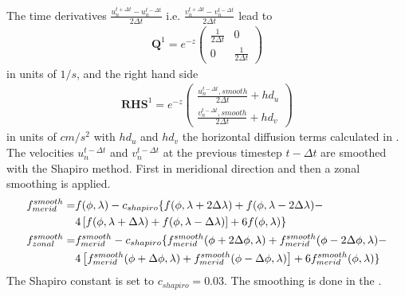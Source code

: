 %
The time derivatives $\frac{ u_n^{t+ \Delta t}- u_n^{t-\Delta t}}{2
\Delta t}$ i.e. $\frac{ v_n^{t+ \Delta t}- v_n^{t-\Delta t}}{2
\Delta t}$ lead to
%
\begin{gather}
  \mathbf{Q}^1= e^{-z}
   \begin{pmatrix}
       \frac{1}{2 \Delta t}&  0\\
       0                   & \frac{1}{2 \Delta t}
   \end{pmatrix}
\end{gather}
%
in units of $1/s$, and the right hand side
%
\begin{gather}
  \mathbf{RHS}^1=e^{-z}
   \begin{pmatrix}
       \frac{u_n^{t-\Delta t},smooth}{2 \Delta t} + hd_u\\
       \frac{v_n^{t-\Delta t},smooth}{2 \Delta t} + hd_v
   \end{pmatrix}
\end{gather}
%
in units of $cm/s^2$ with $hd_u$ and $hd_v$ the horizontal diffusion terms calculated in
 . The velocities $u_n^{t-\Delta t}$ and
$v_n^{t-\Delta t}$ at the previous timestep $t-\Delta t$ are
smoothed with the Shapiro method. First in meridional direction and
then a zonal smoothing is applied.
%
\begin{align}
  f^{smooth}_{merid} = & f(\phi,\lambda) - c_{shapiro}\{  f(\phi,\lambda+2\Delta \lambda) +
  f(\phi,\lambda-2\Delta \lambda) - \notag \\
  {}& 4 \left[ f(\phi,\lambda+\Delta \lambda) + f(\phi,\lambda-\Delta \lambda)  \right]+
  6 f(\phi,\lambda) \} \\
  f^{smooth}_{zonal}
  =& f^{smooth}_{merid} -c_{shapiro} \{  f^{smooth}_{merid}(\phi+2 \Delta \phi,\lambda) +
  f^{smooth}_{merid}(\phi-2\Delta \phi,\lambda) - \notag \\
  {}& 4 \left[ f^{smooth}_{merid}(\phi+\Delta \phi,\lambda)
  + f^{smooth}_{merid}(\phi-\Delta \phi,\lambda)  \right]+
  6 f^{smooth}_{merid}(\phi,\lambda) \} \label{eq:duv_shapiro}
\end{align}
%
The Shapiro constant is set to $c_{shapiro}=
0.03$. The smoothing is done in
the . \\

